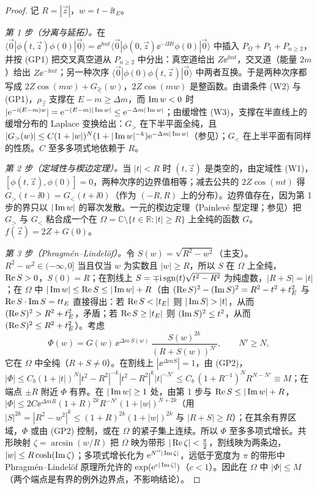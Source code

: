 \begin{proof}
记 $R=|\vec z|$，$w=t-\ii t_E$。

\emph{第 1 步（分离与延拓）。}在 $\langle\vec 0|\phi(t,\vec z)\phi(0)|\vec 0\rangle=\ee^{\ii mt}\langle\vec 0|\phi(0,\vec z)\ee^{-\ii Ht}\phi(0)|\vec 0\rangle$ 中插入 $P_\Omega+P_1+P_{n\ge2}$，并按 (GP1) 把交叉真空道从 $P_{n\ge2}$ 中分出：真空道给出 $Z\ee^{\ii mt}$，交叉道（能量 $2m$）给出 $Z\ee^{-\ii mt}$；另一种次序 $\langle\vec 0|\phi(0)\phi(t,\vec z)|\vec 0\rangle$ 中两者互换。于是两种次序都写成 $2Z\cos(mw)+G_\gtrless(w)$，$2Z\cos(mw)$ 是整函数。由谱条件 (W2) 与 (GP1)，$\rho_{\vec z}$ 支撑在 $E-m\ge\Delta m$，而 $\operatorname{Im} w<0$ 时 $|\mathrm{e}^{-\mathrm{i}(E-m)w}|=\mathrm{e}^{-(E-m)|\operatorname{Im} w|}\le\mathrm{e}^{-\Delta m|\operatorname{Im} w|}$；由缓增性 (W3)，支撑在半直线上的缓增分布的 Laplace 变换给出：$G_>$ 在下半平面全纯，且 $|G_>(w)|\le C(1+|w|)^{N}(1+|\operatorname{Im} w|^{-k})\mathrm{e}^{-\Delta m|\operatorname{Im} w|}$（参见\cite{Vladimirov2002,Streater:1989vi}）；$G_<$ 在上半平面有同样的性质。$C$ 至多多项式地依赖于 $R$。

\emph{第 2 步（定域性与楔边定理）。}当 $|t|<R$ 时 $(t,\vec z)$ 是类空的，由定域性 (W1)，$[\phi(t,\vec z),\phi(0)]=0$，两种次序的边界值相等；减去公共的 $2Z\cos(mt)$ 得 $G_>(t-\ii0)=G_<(t+\ii0)$（作为 $(-R,R)$ 上的分布）。边界值存在，因为第 1 步的界只以 $|\operatorname{Im} w|$ 的幂次发散。一元的楔边定理（Painlevé 型定理；参见\cite{Streater:1989vi}）把 $G_>$ 与 $G_<$ 粘合成一个在
$\Omega=\mathbb C\setminus\{t\in\mathbb R:|t|\ge R\}$ 上全纯的函数 $G$。$f(\vec z)=2Z+G(0)$。

\emph{第 3 步（Phragmén--Lindelöf）。}令 $S(w)=\sqrt{R^2-w^2}$（主支）。$R^2-w^2\in(-\infty,0]$ 当且仅当 $w$ 为实数且 $|w|\ge R$，所以 $S$ 在 $\Omega$ 上全纯，$\operatorname{Re} S>0$，$S(0)=R$；在割线上 $S=\mp\mathrm{i}\,{\rm sgn}(t)\sqrt{t^2-R^2}$ 为纯虚数，$|R+S|=|t|$；在 $\Omega$ 中 $|\operatorname{Im} w|\le\operatorname{Re} S\le|\operatorname{Im} w|+R$（由 $(\operatorname{Re} S)^2-(\operatorname{Im} S)^2=R^2-t^2+t_E^2$ 与 $\operatorname{Re} S\cdot\operatorname{Im} S=tt_E$ 直接得出：若 $\Real S<|t_E|$ 则 $|\Imag S|>|t|$，从而 $(\operatorname{Re} S)^2>R^2+t_E^2$，矛盾；若 $\operatorname{Re} S\ge|t_E|$ 则 $(\operatorname{Im} S)^2\le t^2$，从而 $(\operatorname{Re} S)^2\le R^2+t_E^2$）。考虑
\[
\Phi(w)=G(w)\,\ee^{\Delta m\,S(w)}\,\frac{S(w)^{2k}}{(R+S(w))^{N'}},\qquad N'\ge N,
\]
它在 $\Omega$ 中全纯（$R+S\neq0$）。在割线上 $|\ee^{\Delta mS}|=1$，由 (GP2)，$|\Phi|\le C_b(1+|t|)^N|t^2-R^2|^{-k}|t^2-R^2|^k|t|^{-N'}\le C_b\,(1+R^{-1})^N R^{N-N'}\equiv M$；在端点 $\pm R$ 附近 $\Phi$ 有界。在 $|\operatorname{Im} w|\ge1$ 处，由第 1 步与 $\operatorname{Re} S\le|\operatorname{Im} w|+R$，$|\Phi|\le2C\ee^{\Delta mR}(1+R)^{2k}R^{-N'}(1+|w|)^{N+2k}$（用 $|S|^{2k}=|R^2-w^2|^k\le(1+R)^{2k}(1+|w|)^{2k}$ 与 $|R+S|\ge R$）；在其余有界区域，$\Phi$ 或由 (GP2) 控制，或在 $\Omega$ 的紧子集上连续。所以 $\Phi$ 至多多项式增长。共形映射 $\zeta=\arcsin(w/R)$ 把 $\Omega$ 映为带形 $|\operatorname{Re}\zeta|<\frac\pi2$，割线映为两条边，$|w|\le R\cosh(\operatorname{Im}\zeta)$；多项式增长化为 $\mathrm{e}^{N''|\operatorname{Im}\zeta|}$，远低于宽度为 $\pi$ 的带形中 Phragmén--Lindelöf 原理所允许的 $\exp(\mathrm{e}^{c|\operatorname{Im}\zeta|})$（$c<1$）\cite{Titchmarsh1939}。因此在 $\Omega$ 中 $|\Phi|\le M$（两个端点是有界的例外边界点，不影响结论）。


\end{proof}
